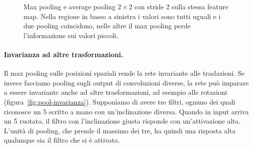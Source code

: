 \begin{figure}[htbp]
\centering
{}
\caption{Max pooling e average pooling $2 \times 2$ con stride 2 sulla stessa feature map. Nella regione in basso a sinistra i valori sono tutti uguali e i due pooling coincidono, nelle altre il max pooling perde l'informazione sui valori piccoli.}
\label{fig:max-avg}
\end{figure}

\paragraph{Invarianza ad altre trasformazioni.}
Il max pooling sulle posizioni spaziali rende la rete invariante alle traslazioni. Se invece facciamo pooling sugli output di convoluzioni diverse, la rete può imparare a essere invariante anche ad altre trasformazioni, ad esempio alle rotazioni (figura~\ref{fig:pool-invarianza}). Supponiamo di avere tre filtri, ognuno dei quali riconosce un 5 scritto a mano con un'inclinazione diversa. Quando in input arriva un 5 ruotato, il filtro con l'inclinazione giusta risponde con un'attivazione alta. L'unità di pooling, che prende il massimo dei tre, ha quindi una risposta alta qualunque sia il filtro che si è attivato.

